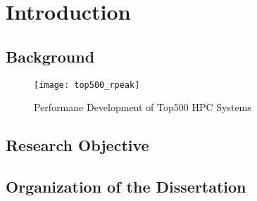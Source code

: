 \chapter{Introduction}

\section{Background}

\begin{figure}
    \centering
    \texttt{[image: top500\_rpeak]}
    \caption{Performane Development of Top500 HPC Systems}%
    \label{fig:top500-rpeak}
\end{figure}

\section{Research Objective}

\section{Organization of the Dissertation}
